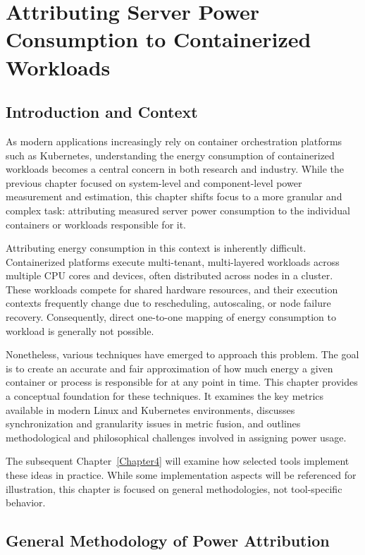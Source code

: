 \chapter{Attributing Server Power Consumption to Containerized Workloads} %
\label{Chapter3}

\section{Introduction and Context}

As modern applications increasingly rely on container orchestration platforms such as Kubernetes, understanding the energy consumption of containerized workloads becomes a central concern in both research and industry. While the previous chapter focused on system-level and component-level power measurement and estimation, this chapter shifts focus to a more granular and complex task: attributing measured server power consumption to the individual containers or workloads responsible for it.

Attributing energy consumption in this context is inherently difficult. Containerized platforms execute multi-tenant, multi-layered workloads across multiple CPU cores and devices, often distributed across nodes in a cluster. These workloads compete for shared hardware resources, and their execution contexts frequently change due to rescheduling, autoscaling, or node failure recovery. Consequently, direct one-to-one mapping of energy consumption to workload is generally not possible.

Nonetheless, various techniques have emerged to approach this problem. The goal is to create an accurate and fair approximation of how much energy a given container or process is responsible for at any point in time. This chapter provides a conceptual foundation for these techniques. It examines the key metrics available in modern Linux and Kubernetes environments, discusses synchronization and granularity issues in metric fusion, and outlines methodological and philosophical challenges involved in assigning power usage.

The subsequent Chapter~\ref{Chapter4} will examine how selected tools implement these ideas in practice. While some implementation aspects will be referenced for illustration, this chapter is focused on general methodologies, not tool-specific behavior.

\section{General Methodology of Power Attribution}

